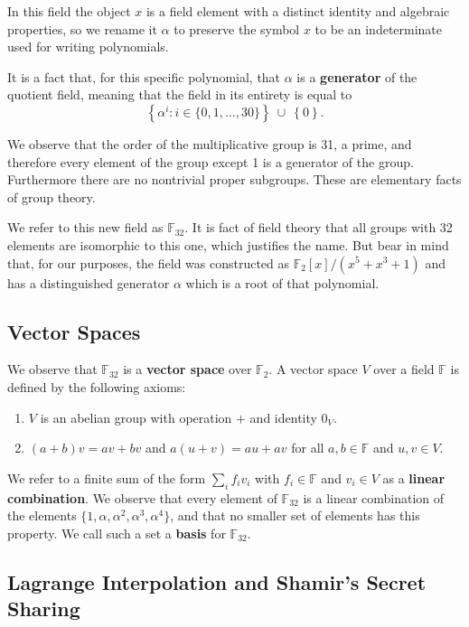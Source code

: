 \documentclass[letterpaper]{article}
\newcommand{\ftwo}{\mathbb{F}_2}
\newcommand{\fttwo}{\mathbb{F}_{32}}
\begin{document}
In this field the object $x$ is a field element with a distinct identity and
algebraic properties, so we rename it $\alpha$ to preserve the symbol $x$ to
be an indeterminate used for writing polynomials.

It is a fact that, for this specific polynomial, that $\alpha$ is a
\textbf{generator} of the quotient field, meaning that the field in its entirety
is equal to
\[ \left\{ \alpha^i : i \in \{0,1,\ldots,30\} \right\} ~\cup~ \left\{ 0 \right\}. \]

We observe that the order of the multiplicative group is 31, a prime, and therefore
every element of the group except 1 is a generator of the group. Furthermore there
are no nontrivial proper subgroups. These are elementary facts of group theory.

We refer to this new field as $\fttwo$. It is fact of field theory that all
groups with 32 elements are isomorphic to this one, which justifies the name.
But bear in mind that, for our purposes, the field was constructed as $\ftwo[x]/
(x^5 + x^3 + 1)$ and has a distinguished generator $\alpha$ which is a root
of that polynomial.

\subsection{Vector Spaces}

We observe that $\fttwo$ is a \textbf{vector space} over $\ftwo$. A vector
space $V$ over a field $\mathbb{F}$ is defined by the following axioms:

\begin{enumerate}
\item $V$ is an abelian group with operation $+$ and identity $0_V$.
\item $(a + b)v = av + bv$ and $a(u + v) = au + av$ for all $a,b\in \mathbb{F}$ and
$u,v\in V$.
\end{enumerate}

We refer to a finite sum of the form $\sum_i f_{i}v_i$ with $f_i\in \mathbb{F}$ and
$v_i\in V$ as a \textbf{linear combination}. We observe that every element
of $\fttwo$ is a linear combination of the elements $\{1,\alpha,\alpha^2,
\alpha^3,\alpha^4\}$, and that no smaller set of elements has this property.
We call such a set a \textbf{basis} for $\fttwo$.

\subsection{Lagrange Interpolation and Shamir's Secret Sharing\label{sec:sss}}
\end{document}
